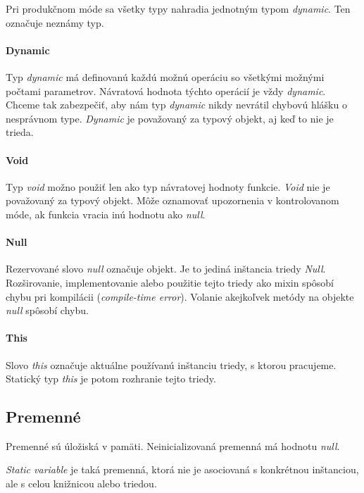 Pri produkčnom móde sa všetky typy nahradia jednotným typom \emph{dynamic}. Ten označuje neznámy typ.

\paragraph{Dynamic}
Typ \emph{dynamic} má definovanú každú možnú operáciu so všetkými možnými počtami parametrov. Návratová hodnota týchto operácií je vždy \emph{dynamic}. Chceme tak zabezpečiť, aby nám typ \emph{dynamic} nikdy nevrátil chybovú hlášku o nesprávnom type. \emph{Dynamic} je považovaný za typový objekt, aj keď to nie je trieda.

\paragraph{Void}
Typ \emph{void} možno použiť len ako typ návratovej hodnoty funkcie. \emph{Void} nie je považovaný za typový objekt. Môže oznamovať upozornenia v kontrolovanom móde, ak funkcia vracia inú hodnotu ako \emph{null}.

\paragraph{Null}
Rezervované slovo \emph{null} označuje  objekt. Je to jediná inštancia triedy \emph{Null}. Rozširovanie, implementovanie alebo použitie tejto triedy ako mixin spôsobí chybu pri kompilácii (\emph{compile-time error}).
Volanie akejkoľvek metódy na objekte \emph{null} spôsobí chybu.

\paragraph{This}%
Slovo \emph{this} označuje aktuálne používanú inštanciu triedy, s ktorou pracujeme. Statický typ \emph{this} je potom rozhranie tejto triedy.

\subsection{Premenné}
Premenné sú úložiská v pamäti. Neinicializovaná premenná má hodnotu \emph{null}.

\emph{Static variable} je taká premenná, ktorá nie je asociovaná s konkrétnou inštanciou, ale s celou knižnicou alebo triedou.


